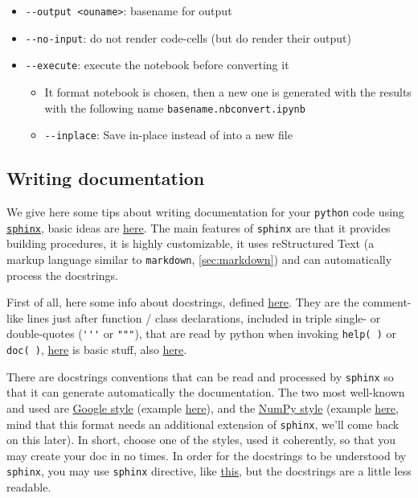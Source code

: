 \documentclass[a4paper,12pt,%
              final%
              ]{article}
\begin{document}
\begin{itemize}
\begin{itemize}
      \item \verb|--output <ouname>|: basename for output
      \item \verb|--no-input|: do not render code-cells (but do render their output)
      \item \verb|--execute|: execute the notebook before converting it
        \begin{itemize}
          \item It format notebook is chosen, then a new one is generated with the results with the following name \texttt{basename.nbconvert.ipynb}
          \item \verb|--inplace|: Save in-place instead of into a new file
        \end{itemize}
    \end{itemize}
\end{itemize}

\subsection{Writing documentation}
We give here some tips about writing documentation for your \texttt{python} code using \href{https://www.sphinx-doc.org/en/master/index.html}{\texttt{sphinx}}, basic ideas are \href{https://docs.python-guide.org/writing/documentation/}{here}. The main features of \texttt{sphinx} are that it provides building procedures, it is highly customizable, it uses reStructured Text (a markup language similar to \texttt{markdown}, \autoref{sec:markdown}) and can automatically process the docstrings.

First of all, here some info about docstrings, defined \href{https://www.python.org/dev/peps/pep-0257/}{here}. They are the comment-like lines just after function / class declarations, included in triple single- or double-quotes (\verb|'''| or \verb|"""|), that are read by python when invoking \texttt{help( )} or \texttt{doc( )}, \href{https://www.geeksforgeeks.org/python-docstrings/}{here} is basic stuff, also \href{https://www.programiz.com/python-programming/docstrings}{here}.

There are docstrings conventions that can be read and processed by \texttt{sphinx} so that it can generate automatically the documentation. The two most well-known and used are \href{https://www.programiz.com/python-programming/docstrings}{Google style} (example \href{https://sphinxcontrib-napoleon.readthedocs.io/en/latest/example_google.html}{here}), and the \href{https://numpydoc.readthedocs.io/en/latest/format.html}{NumPy style} (example \href{https://sphinxcontrib-napoleon.readthedocs.io/en/latest/example_numpy.html#example-numpy}{here}, mind that this format needs an additional extension of \texttt{sphinx}, we'll come back on this later). In short, choose one of the styles, used it coherently, so that you may create your doc in no times. In order for the docstrings to be understood by \texttt{sphinx}, you may use \texttt{sphinx} directive, like \href{https://sphinx-rtd-tutorial.readthedocs.io/en/latest/docstrings.html#an-example-class-with-docstrings}{this}, but the docstrings are a little less readable.
\end{document}
